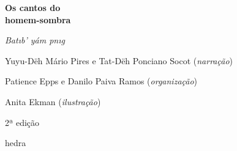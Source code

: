 




\begingroup\thispagestyle{empty}\vspace*{.05\textheight} 

              \formular
              \huge
              \noindent
              \textbf{Os cantos do\\ homem-sombra}

              \vspace{0.3em}
              
              \large
              \noindent
              \textit{Bat\i{}b’ yám p\I{}n\i{}g}
              
              \vspace{6em}

              
              \newfontfamily{}
              {\selectfont\garamond\small\noindent Yuyu-Dëh Mário Pires e Tat-Dëh Ponciano Socot (\textit{narração})}

              {\selectfont\garamond\small\noindent Patience Epps e Danilo Paiva Ramos (\textit{organização})}

              {\selectfont\garamond\small\noindent Anita Ekman (\textit{ilustração})}

              \bigskip

              \noindent
              {\selectfont\garamond\small\noindent 2ª edição}

              \vfill

              \newfontfamily{}
              {\noindent\fontsize{30}{40}\selectfont \timesnewroman hedra}



\endgroup
\pagebreak
